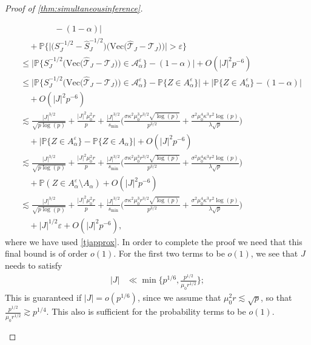 \documentclass[10pt]{article}
\newcommand{\0}{{\mathbf{0}}}
\newcommand{\1}{{\mathbf{1}}}
\newcommand{\eps}{\varepsilon}
\newcommand{\p}{\mathbb{P}}
\renewcommand{\hat}{\widehat}
\renewcommand{\hat}{\widehat}
\begin{document}
\begin{proof}[Proof of \cref{thm:simultaneousinference}]
\begin{itemize}
\begin{align*}
    &\qquad\qquad- (1 - \alpha) \bigg| \\
    &\quad + \p\bigg\{ \bigg|\big( S_{J}^{-1/2} - \hat S_{J}^{-1/2}\big) \bigg( \mathrm{Vec}\big( \mathcal{\hat T}_J - \mathcal{T}_J \big) \bigg) \big| > \eps \bigg\} \\
    &\leq \bigg| \p\bigg\{  S_{J}^{-1/2} \bigg( \mathrm{Vec}\big( \mathcal{\hat T}_J - \mathcal{T}_J \big) \bigg) \in \mathcal{A}_{\alpha}^{\eps} \bigg\} - (1- \alpha) \bigg|+ O(|J|^2p^{-6}) \\
    &\leq \bigg| \p\bigg\{  S_{J}^{-1/2} \bigg( \mathrm{Vec}\big( \mathcal{\hat T}_J - \mathcal{T}_J \big) \bigg) \in \mathcal{A}_{\alpha}^{\eps} \bigg\} - \p\bigg\{ Z \in A_\alpha^{\eps} \bigg\} \bigg| + \bigg| \p\bigg\{ Z \in A_{\alpha}^{\eps} \bigg\} - (1 - \alpha) \bigg| \\
    &\quad + O(|J|^2p^{-6}) \\
    &\lesssim \frac{|J|^{3/2}}{\sqrt{p\log(p)}} + \frac{|J|^2\mu_0^2 r}{p}  +\frac{ |J|^{3/2}}{s_{\min}}\bigg( \frac{\sigma \kappa^2 \mu_0^3 r^{3/2} \sqrt{\log(p)}}{p^{3/2}} + \frac{\sigma^2 \mu_0^4 \kappa^3 r^2 \log(p)}{\lambda \sqrt{p}} \bigg) \\
    &\quad + \bigg| \p\bigg\{ Z \in A_{\alpha}^{\eps} \bigg\} - \p\bigg\{ Z \in A_{\alpha} \bigg\} \bigg| + O(|J|^2p^{-6}) \\
    &\lesssim \frac{|J|^{3/2}}{\sqrt{p\log(p)}} + \frac{|J|^2\mu_0^2 r}{p}  +\frac{ |J|^{3/2}}{s_{\min}}\bigg( \frac{\sigma \kappa^2 \mu_0^3 r^{3/2} \sqrt{\log(p)}}{p^{3/2}} + \frac{\sigma^2 \mu_0^4 \kappa^3 r^2 \log(p)}{\lambda \sqrt{p}} \bigg) \\
    &\quad + \p( Z \in A^{\eps}_{\alpha} \setminus A_{\alpha}) + O(|J|^2p^{-6}) \\
    &\lesssim \frac{|J|^{3/2}}{\sqrt{p\log(p)}} + \frac{|J|^2\mu_0^2 r}{p}  +\frac{ |J|^{3/2}}{s_{\min}}\bigg( \frac{\sigma \kappa^2 \mu_0^3 r^{3/2} \sqrt{\log(p)}}{p^{3/2}} + \frac{\sigma^2 \mu_0^4 \kappa^3 r^2 \log(p)}{\lambda \sqrt{p}} \bigg) \\
    &\quad + |J|^{1/2} \eps + O(|J|^2p^{-6}),
\end{align*}
where we have used \eqref{tjapprox}.  
In order to complete the proof we need that this final bound is of order $o(1)$.  For the first two terms to be $o(1)$, we see that $J$ needs to satisfy
\begin{align*}
    |J| &\ll \min\bigg\{ p^{1/6}, \frac{p^{1/2}}{\mu_0 r^{1/2}} \bigg\}; 
\end{align*}
This is guaranteed if $|J| = o(p^{1/6})$, since we assume that $\mu_0^2 r \lesssim \sqrt{p}$, so that $\frac{p^{1/2}}{\mu_0 r^{1/2}} \gtrsim p^{1/4}$. This also is sufficient for the probability terms to be $o(1)$. 


\end{itemize}
\end{proof}
\end{document}
